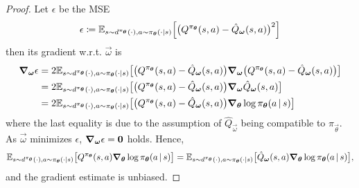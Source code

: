 			\begin{proof}
				Let \(\epsilon\) be the \ac{MSE}
				\begin{equation}
					\epsilon \coloneqq \mathbb{E}_{s \sim d^{\pi_{\bm{\theta}}}(\cdot), a \sim \pi_{\bm{\theta}}(\cdot \vert s)}\Bigl[ \bigl( Q^{\pi_{\bm{\theta}}}(s, a) - \hat{Q}_{\bm{\omega}}(s, a) \bigr)^2 \Bigr]
				\end{equation}
				then its gradient w.r.t. \(\vec{\omega}\) is
				\begin{align}
					\grad_{\bm{\omega}} \epsilon
						&= 2 \mathbb{E}_{s \sim d^{\pi_{\bm{\theta}}}(\cdot), a \sim \pi_{\bm{\theta}}(\cdot \vert s)}\bigl[ \bigl( Q^{\pi_{\bm{\theta}}}(s, a) - \hat{Q}_{\bm{\omega}}(s, a) \bigr) \grad_{\bm{\omega}} \bigl( Q^{\pi_{\bm{\theta}}}(s, a) - \hat{Q}_{\bm{\omega}}(s, a) \bigr) \bigr] \\
						&= 2 \mathbb{E}_{s \sim d^{\pi_{\bm{\theta}}}(\cdot), a \sim \pi_{\bm{\theta}}(\cdot \vert s)}\bigl[ \bigl( Q^{\pi_{\bm{\theta}}}(s, a) - \hat{Q}_{\bm{\omega}}(s, a) \bigr) \grad_{\bm{\omega}} \hat{Q}_{\bm{\omega}}(s, a) \bigr] \\
						&= 2 \mathbb{E}_{s \sim d^{\pi_{\bm{\theta}}}(\cdot), a \sim \pi_{\bm{\theta}}(\cdot \vert s)}\bigl[ \bigl( Q^{\pi_{\bm{\theta}}}(s, a) - \hat{Q}_{\bm{\omega}}(s, a) \bigr) \grad_{\bm{\theta}} \log \pi_{\bm{\theta}}(a \,\vert\, s) \bigr]
				\end{align}
				where the last equality is due to the assumption of \(\hat{Q}_{\vec{\omega}}\) being compatible to \(\pi_{\vec{\theta}}\). As \(\vec{\omega}\) minimizes \(\epsilon\), \( \grad_{\bm{\omega}} \epsilon = \bm{0} \) holds. Hence,
				\begin{equation}
					\mathbb{E}_{s \sim d^{\pi_{\bm{\theta}}}(\cdot), a \sim \pi_{\bm{\theta}}(\cdot \vert s)}\bigl[ Q^{\pi_{\bm{\theta}}}(s, a) \grad_{\bm{\theta}} \log \pi_{\bm{\theta}}(a \,\vert\, s) \bigr] = \mathbb{E}_{s \sim d^{\pi_{\bm{\theta}}}(\cdot), a \sim \pi_{\bm{\theta}}(\cdot \vert s)}\bigl[ \hat{Q}_{\bm{\omega}}(s, a) \grad_{\bm{\theta}} \log \pi_{\bm{\theta}}(a \,\vert\, s) \bigr],
				\end{equation}
				and the gradient estimate is unbiased.
			\end{proof}

